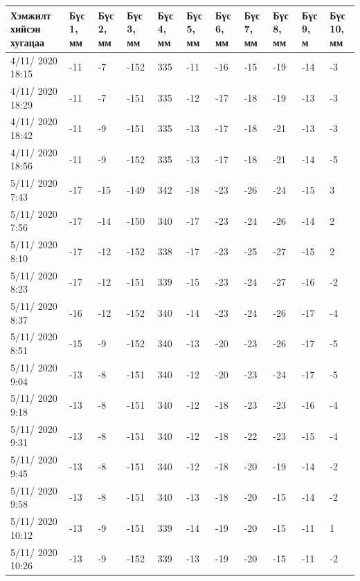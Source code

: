 \begin{table}[h]
    \centering
    \begin{tabular}{|p{1.5cm}|p{0.8cm}|p{0.8cm}|p{0.8cm}|p{0.8cm}|p{0.8cm}|p{0.8cm}|p{0.8cm}|p{0.8cm}|p{0.8cm}|p{0.8cm}|}
         \hline
     Хэмжилт хийсэн хугацаа & Бүс 1, мм&	Бүс 2, мм&	Бүс 3, мм&	Бүс 4, мм&	Бүс 5, мм&	Бүс 6, мм&	Бүс 7, мм&	Бүс 8, мм&	Бүс 9, м&	Бүс 10, мм \\ \hline
4/11/ 2020 18:15&	-11&-7&	-152&	335&-11&-16&-15&-19&-14&	-3 \\ \hline
4/11/ 2020 18:29&	-11&-7&	-151&	335&-12&-17&-18&-19&-13&	-3 \\ \hline
4/11/ 2020 18:42&	-11&-9&	-151&	335&-13&-17&-18&-21&-13&	-3 \\ \hline
4/11/ 2020 18:56&	-11&-9&	-152&	335&-13&-17&-18&-21&-14&	-5 \\ \hline
5/11/ 2020 7:43&	-17&-15&-149&	342&-18&-23&-26&-24&-15&	3 \\ \hline
5/11/ 2020 7:56&	-17&-14&-150&	340&-17&-23&-24&-26&-14&	2 \\ \hline
5/11/ 2020 8:10&	-17&-12&-152&	338&-17&-23&-25&-27&-15&	2 \\ \hline
5/11/ 2020 8:23&	-17&-12&-151&	339&-15&-23&-24&-27&-16&	-2 \\ \hline
5/11/ 2020 8:37&	-16&-12&-152&	340&-14&-23&-24&-26&-17&	-4 \\ \hline
5/11/ 2020 8:51&	-15&-9&	-152&	340&-13&-20&-23&-26&-17&	-5 \\ \hline
5/11/ 2020 9:04&	-13&-8&	-151&	340&-12&-20&-23&-24&-17&	-5 \\ \hline
5/11/ 2020 9:18&	-13&-8&	-151&	340&-12&-18&-23&-23&-16&	-4 \\ \hline
5/11/ 2020 9:31&	-13&-8&	-151&	340&-12&-18&-22&-23&-15&	-4 \\ \hline
5/11/ 2020 9:45&	-13&-8&	-151&	340&-12&-18&-20&-19&-14&	-2 \\ \hline
5/11/ 2020 9:58&	-13&-8&	-151&	340&-13&-18&-20&-15&-14&	-2 \\ \hline
5/11/ 2020 10:12&	-13&-9&	-151&	339&-14&-19&-20&-15&-11&	1 \\ \hline
5/11/ 2020 10:26&	-13&-9&	-152&	339&-13&-19&-20&-15&-11&	-2 \\ \hline
    \end{tabular}
\end{table}